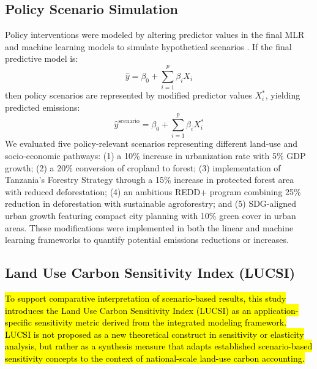 \documentclass[10pt,letterpaper]{article}
\begin{document}
\subsection{Policy Scenario Simulation}

Policy interventions were modeled by altering predictor values in the final MLR and machine learning models to simulate hypothetical scenarios \cite{mkhitaryan2023use, gawusu2024predictive}. If the final predictive model is:
\begin{equation}
\hat{y} = \beta_0 + \sum_{i=1}^p \beta_i X_i
\end{equation}
then policy scenarios are represented by modified predictor values \(X_i^{*}\), yielding predicted emissions:
\begin{equation}
\hat{y}^{\text{scenario}} = \beta_0 + \sum_{i=1}^p \beta_i X_i^{*}
\end{equation}
We evaluated five policy-relevant scenarios representing different land-use and socio-economic pathways: (1) a 10\% increase in urbanization rate with 5\% GDP growth; (2) a 20\% conversion of cropland to forest; (3) implementation of Tanzania's Forestry Strategy through a 15\% increase in protected forest area with reduced deforestation; (4) an ambitious REDD+ program combining 25\% reduction in deforestation with sustainable agroforestry; and (5) SDG-aligned urban growth featuring compact city planning with 10\% green cover in urban areas. These modifications were implemented in both the linear and machine learning frameworks to quantify potential emissions reductions or increases.

\subsection{Land Use Carbon Sensitivity Index (LUCSI)}
\label{sec:lucs}

\hl{To support comparative interpretation of scenario-based results, this study introduces the Land Use Carbon Sensitivity Index (LUCSI) as an application-specific sensitivity metric derived from the integrated modeling framework. LUCSI is not proposed as a new theoretical construct in sensitivity or elasticity analysis, but rather as a synthesis measure that adapts established scenario-based sensitivity concepts to the context of national-scale land-use carbon accounting.}
\end{document}
